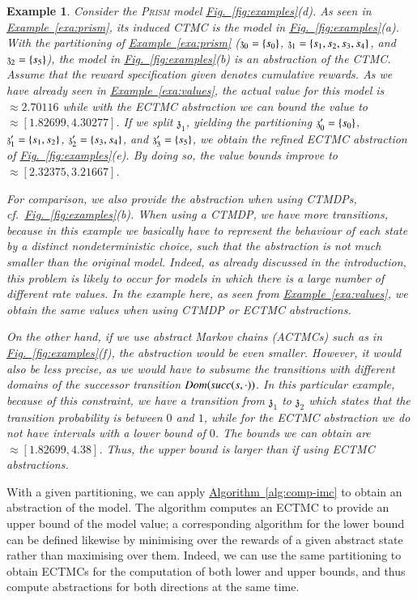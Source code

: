 \documentclass[10pt,twocolumn]{article}
\newtheorem{example}{Example}
\newcommand{\PRISM}{\textsc{Prism}\xspace}
\newcommand{\state}  {{\ensuremath s}}
\newcommand{\astate}{\mathfrak{z}}
\newcommand{\prismSucc}{\mathit{succ}}
\newcommand{\reffig}[1]{\texorpdfstring{\hyperref[fig:#1]{Fig.~\ref*{fig:#1}}}{Fig.~\ref*{fig:#1}}}
\newcommand{\refexa}[1]{\texorpdfstring{\hyperref[exa:#1]{Example~\ref*{exa:#1}}}{Example~\ref*{exa:#1}}}
\newcommand{\refalg}[1]{\texorpdfstring{\hyperref[alg:#1]{Algorithm~\ref*{alg:#1}}}{Algorithm~\ref*{alg:#1}}}
\newcommand{\dom}{\mathit{Dom}}
\begin{document}
\begin{example}
  \label{exa:abstraction}
Consider the \PRISM model \reffig{examples}(d).
  As seen in \refexa{prism}, its induced CTMC is the model in \reffig{examples}(a).
  With the partitioning of \refexa{prism} ($\astate_0 = \{\state_0\}$, $\astate_1 = \{\state_1, \state_2, \state_3, \state_4\}$, 
  and $\astate_2 = \{\state_5\}$), the model in \reffig{examples}(b) is an abstraction of the CTMC.
  Assume that the reward specification given denotes cumulative rewards.
  As we have already seen in \refexa{values}, the actual value for this model is 
  $\approx 2.70116$ while with the ECTMC abstraction we can bound the value to $\approx [1.82699,4.30277]$.
  If we split $\astate_1$, yielding the partitioning
  $\astate_0' = \{\state_0\}$, $\astate_1' = \{\state_1, \state_2\}$, $\astate_2' = \{\state_3, \state_4\}$, 
  and $\astate_3' = \{\state_5\}$, we obtain the refined ECTMC abstraction of \reffig{examples}(e).
  By doing so, the value bounds improve to $\approx [2.32375,3.21667]$.

  For comparison, we also provide the abstraction when using CTMDPs, cf.\ \reffig{examples}(b).
  When using a CTMDP, we have more transitions, because in this example we basically 
  have to represent the behaviour of each state by a distinct nondeterministic choice, 
  such that the abstraction is not much smaller than the original model.
  Indeed, as already discussed in the introduction, this problem is likely to occur 
  for models in which there is a large number of different rate values.
  In the example here, as seen from \refexa{values}, we obtain the same values 
  when using CTMDP or ECTMC abstractions.

  On the other hand, if we use abstract Markov chains (ACTMCs) \cite{KatoenKLW07} such as 
  in \reffig{examples}(f), the abstraction would be even smaller.
  However, it would also be less precise, as we would have to subsume the transitions with different domains of the successor 
  transition $\dom(\prismSucc(\state, \cdot))$.
  In this particular example, because of this constraint, we have a transition from $\astate_1$ to $\astate_2$ which states 
  that the transition probability is between $0$ and $1$, while for the ECTMC abstraction we do not 
  have intervals with a lower bound of $0$.
  The bounds we can obtain are $\approx [1.82699,4.38]$.
  Thus, the upper bound is larger than if using ECTMC abstractions.
\end{example}

With a given partitioning, we can apply \refalg{comp-imc} to obtain an
abstraction of the model. The algorithm computes an ECTMC to provide
an upper bound of the model value; a corresponding algorithm for the
lower bound can be defined likewise by minimising over the rewards of a given abstract state rather than maximising over them.
Indeed, we can use the same partitioning to obtain ECTMCs for the computation of both lower and upper bounds,
and thus compute abstractions for both directions at the same time.
\end{document}
